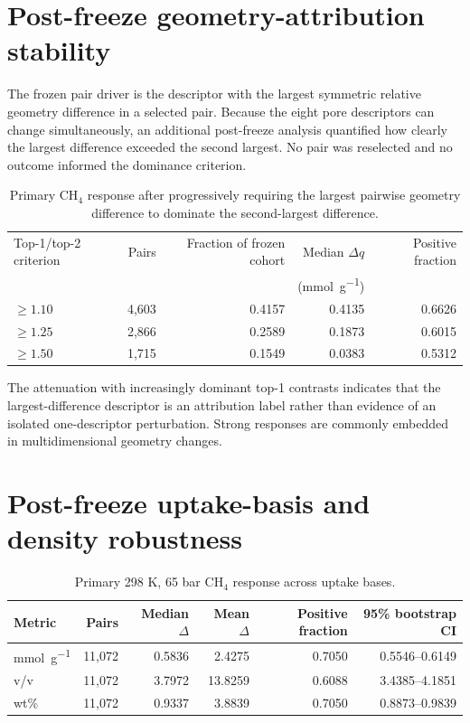 
\section{Post-freeze geometry-attribution stability}

The frozen pair driver is the descriptor with the largest symmetric relative
geometry difference in a selected pair. Because the eight pore descriptors can
change simultaneously, an additional post-freeze analysis quantified how clearly
the largest difference exceeded the second largest. No pair was reselected and no
outcome informed the dominance criterion.

\begin{table}[H]
\centering
\caption{Primary CH$_4$ response after progressively requiring the largest pairwise
geometry difference to dominate the second-largest difference.}
\label{tab:S26}
\begin{tabular}{lrrrr}
\toprule
Top-1/top-2 criterion & Pairs & Fraction of frozen cohort & Median $\Delta q$ & Positive fraction \\
 & & & (\si{\milli\mole\per\gram}) & \\
\midrule
$\geq1.10$ & 4,603 & 0.4157 & 0.4135 & 0.6626 \\
$\geq1.25$ & 2,866 & 0.2589 & 0.1873 & 0.6015 \\
$\geq1.50$ & 1,715 & 0.1549 & 0.0383 & 0.5312 \\
\bottomrule
\end{tabular}
\end{table}

The attenuation with increasingly dominant top-1 contrasts indicates that the
largest-difference descriptor is an attribution label rather than evidence of an
isolated one-descriptor perturbation. Strong responses are commonly embedded in
multidimensional geometry changes.

\section{Post-freeze uptake-basis and density robustness}

\begin{table}[H]
\centering
\caption{Primary 298 K, 65 bar CH$_4$ response across uptake bases.}
\label{tab:S27}
\begin{tabular}{lrrrrr}
\toprule
Metric & Pairs & Median $\Delta$ & Mean $\Delta$ & Positive fraction & 95\% bootstrap CI \\
\midrule
\si{\milli\mole\per\gram} & 11,072 & 0.5836 & 2.4275 & 0.7050 & 0.5546--0.6149 \\
v/v & 11,072 & 3.7972 & 13.8259 & 0.6088 & 3.4385--4.1851 \\
wt\% & 11,072 & 0.9337 & 3.8839 & 0.7050 & 0.8873--0.9839 \\
\bottomrule
\end{tabular}
\end{table}

